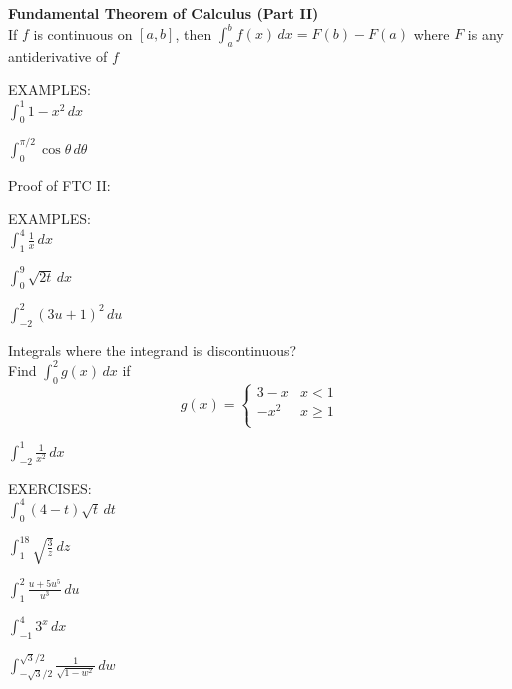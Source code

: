 \documentclass[11pt]{article}
\begin{document}
\pagebreak

{\bf Fundamental Theorem of Calculus (Part II)} \\

If $f$ is continuous on $[a,b]$, then $\int_a^bf(x)\, dx = F(b)-F(a)$ where $F$ is any
antiderivative of $f$

\vspace{.8in}

EXAMPLES:\\

$\int_{0}^{1}1-x^2\, dx$

\vspace{1.5in}

$\int_{0}^{\pi/2}\cos{\theta}\, d\theta$


\vspace{1in}

Proof of FTC II: \\


\pagebreak


EXAMPLES:\\

$\int_{1}^{4}\frac{1}{x}\, dx$

\vspace{1.5in}

$\int_{0}^{9}\sqrt{2t}\, dx$

\vspace{1.5in}

$\int_{-2}^{2}(3u+1)^2\, du$

\vspace{1.5in}

Integrals where the integrand is discontinuous?\\

\vspace{.3in}
Find $\int_{0}^{2}g(x)\, dx$ if\\

  \begin{displaymath}
g(x) =   \left\{ \begin{array}{ll}
3-x & x < 1 \\
-x^2 & x \ge 1\\
\end{array} \right.
  \end{displaymath}




\vspace{1.5in}


$\int_{-2}^{1}\frac{1}{x^2}\, dx$

\vspace{1.5in}





EXERCISES: \\


$\int_{0}^{4}(4-t)\sqrt{t}\, dt$

\vspace{1.in}

$\int_{1}^{18}\sqrt{\frac{3}{z}}\, dz$

\vspace{1.in}

$\int_{1}^{2}\frac{u+5u^5}{u^3}\, du$

\vspace{1.in}

$\int_{-1}^{4}3^x\, dx$

\vspace{1.in}

$\int_{-\sqrt{3}/2}^{\sqrt{3}/2}\frac{1}{\sqrt{1-w^2}}\, dw$

\vspace{1.in}
\end{document}
